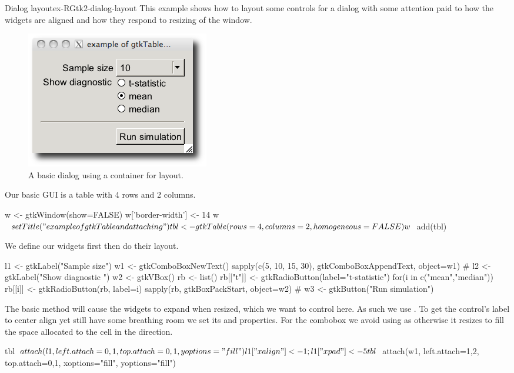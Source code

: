 \begin{example}{Dialog layout}{ex-RGtk2-dialog-layout}
This example shows how to layout some controls for a dialog with some
attention paid to how the widgets are aligned and how they respond to
resizing of the window.

\begin{figure}
  \centering
  \includegraphics[width=.5\textwidth]{ex-RGtk2-dialog-layout}
  \caption{A basic dialog using a  container for layout.}
  \label{fig:RGtk2-dialog-layout}
\end{figure}


Our basic GUI is a table with 4 rows and 2 columns.
\begin{Schunk}
\begin{Sinput}
 w <- gtkWindow(show=FALSE)
 w['border-width'] <- 14
 w$setTitle("example of gtkTable and attaching")
 tbl <- gtkTable(rows=4, columns=2, homogeneous=FALSE)
 w$add(tbl)
\end{Sinput}
\end{Schunk}

We define our widgets first then do their layout.
\begin{Schunk}
\begin{Sinput}
 l1 <- gtkLabel("Sample size")
 w1 <- gtkComboBoxNewText()
 sapply(c(5, 10, 15, 30), gtkComboBoxAppendText, object=w1)
 #
 l2 <- gtkLabel("Show diagnostic ")
 w2 <- gtkVBox()
 rb <- list()
 rb[["t"]] <- gtkRadioButton(label="t-statistic")
 for(i in c("mean","median")) rb[[i]] <- gtkRadioButton(rb, label=i)
 sapply(rb, gtkBoxPackStart, object=w2)
 #
 w3 <- gtkButton("Run simulation")
\end{Sinput}
\end{Schunk}

The basic  method will cause the widgets to
expand when resized, which we want to control here. As such we use
. To get the control's label to center align yet still
have some breathing room we set its
 and   properties.
For the combobox we avoid using  as otherwise it resizes
to fill the space allocated to the cell in the  direction.
\begin{Schunk}
\begin{Sinput}
 tbl$attach(l1, left.attach=0,1, top.attach=0,1, yoptions="fill")
 l1["xalign"] <- 1; l1["xpad"] <- 5
 tbl$attach(w1, left.attach=1,2, top.attach=0,1, xoptions="fill", yoptions="fill")
\end{Sinput}
\end{Schunk}


\end{example}
